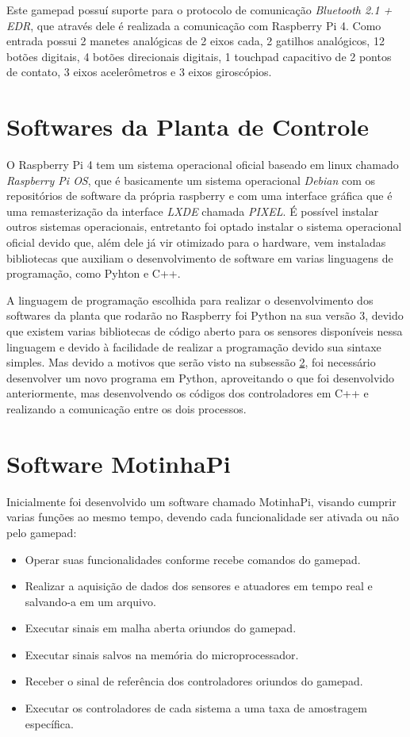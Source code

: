             Este gamepad possuí suporte para o protocolo de comunicação \textit{Bluetooth 2.1 + EDR}, que através dele é realizada a comunicação com Raspberry Pi 4. Como entrada possui 2 manetes analógicas de 2 eixos cada, 2 gatilhos analógicos, 12 botões digitais, 4 botões direcionais digitais, 1 touchpad capacitivo de 2 pontos de contato, 3 eixos acelerômetros e 3 eixos giroscópios.
            
            
    \section{Softwares da Planta de Controle}
        
        O Raspberry Pi 4 tem um sistema operacional oficial baseado em linux chamado \textit{Raspberry Pi OS}, que é basicamente um sistema operacional \textit{Debian} com os repositórios de software da própria raspberry e com uma interface gráfica que é uma remasterização da interface \textit{LXDE} chamada \textit{PIXEL}. É possível instalar outros sistemas operacionais, entretanto foi optado instalar o sistema operacional oficial devido que, além dele já vir otimizado para o hardware, vem instaladas bibliotecas que auxiliam o desenvolvimento de software em varias linguagens de programação, como Pyhton e C++.
        
        A linguagem de programação escolhida para realizar o desenvolvimento dos softwares da planta que rodarão no Raspberry foi Python na sua versão 3, devido que existem varias bibliotecas de código aberto para os sensores disponíveis nessa linguagem e devido à facilidade de realizar a programação devido sua sintaxe simples. Mas devido a motivos que serão visto na subsessão \ref{}, foi necessário desenvolver um novo programa em Python, aproveitando o que foi desenvolvido anteriormente, mas desenvolvendo os códigos dos controladores em C++ e realizando a comunicação entre os dois processos.
        
        
    \section{Software MotinhaPi}
        
        Inicialmente foi desenvolvido um software chamado MotinhaPi, visando cumprir varias funções ao mesmo tempo, devendo cada funcionalidade ser ativada ou não pelo gamepad:
        \begin{itemize}
            \item Operar suas funcionalidades conforme recebe comandos do gamepad.
            \item Realizar a aquisição de dados dos sensores e atuadores em tempo real e salvando-a em um arquivo.
            \item Executar sinais em malha aberta oriundos do gamepad.
            \item Executar sinais salvos na memória do microprocessador.
            \item Receber o sinal de referência dos controladores oriundos do gamepad.
            \item Executar os controladores de cada sistema a uma taxa de amostragem específica.
        \end{itemize}
        
